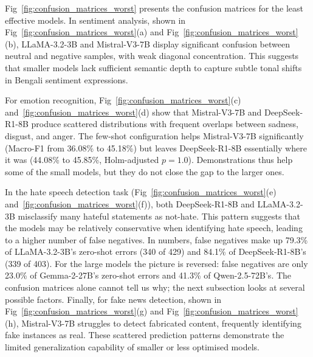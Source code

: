 \documentclass[10pt,letterpaper]{article}
\begin{document}
Fig~\ref{fig:confusion_matrices_worst} presents the confusion matrices for the least effective models. In sentiment analysis, shown in Fig~\ref{fig:confusion_matrices_worst}(a) and Fig~\ref{fig:confusion_matrices_worst}(b), LLaMA-3.2-3B and Mistral-V3-7B display significant confusion between neutral and negative samples, with weak diagonal concentration. This suggests that smaller models lack sufficient semantic depth to capture subtle tonal shifts in Bengali sentiment expressions.

For emotion recognition, Fig~\ref{fig:confusion_matrices_worst}(c) and~\ref{fig:confusion_matrices_worst}(d) show that Mistral-V3-7B and DeepSeek-R1-8B produce scattered distributions with frequent overlaps between sadness, disgust, and anger. The few-shot configuration helps Mistral-V3-7B significantly (Macro-F1 from 36.08\% to 45.18\%) but leaves DeepSeek-R1-8B essentially where it was (44.08\% to 45.85\%, Holm-adjusted $p = 1.0$). Demonstrations thus help some of the small models, but they do not close the gap to the larger ones.

In the hate speech detection task (Fig~\ref{fig:confusion_matrices_worst}(e) and~\ref{fig:confusion_matrices_worst}(f)), both DeepSeek-R1-8B and LLaMA-3.2-3B misclassify many hateful statements as not-hate. This pattern suggests that the models may be relatively conservative when identifying hate speech, leading to a higher number of false negatives. In numbers, false negatives make up 79.3\% of LLaMA-3.2-3B's zero-shot errors (340 of 429) and 84.1\% of DeepSeek-R1-8B's (339 of 403). For the large models the picture is reversed: false negatives are only 23.0\% of Gemma-2-27B's zero-shot errors and 41.3\% of Qwen-2.5-72B's. The confusion matrices alone cannot tell us why; the next subsection looks at several possible factors. Finally, for fake news detection, shown in Fig~\ref{fig:confusion_matrices_worst}(g) and Fig~\ref{fig:confusion_matrices_worst}(h), Mistral-V3-7B struggles to detect fabricated content, frequently identifying fake instances as real. These scattered prediction patterns demonstrate the limited generalization capability of smaller or less optimised models.
\end{document}
